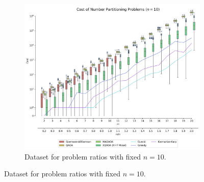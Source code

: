 \begin{widetext}

\begin{minipage}{\linewidth}

\begin{figure}[H]
\captionsetup{justification=centering}
    \centering
    \begin{subfigure}[b]{\textwidth}
        \centering
        \includegraphics[scale=0.55]{"../figures/fixed_n.png"}
        \caption{Dataset for problem ratios with fixed $n=10$.}
        \label{fig:fixed_n}
    \end{subfigure}

    \hfill


\end{figure}
\end{minipage}
\end{widetext}
